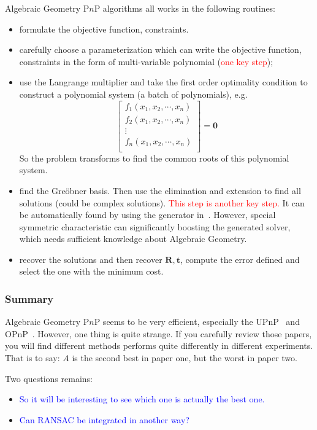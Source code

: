 \documentclass[a4paper]{article}
\begin{document}
Algebraic Geometry P$n$P algorithms all works in the following routines:
\begin{itemize}
\item formulate the objective function, constraints.
\item carefully choose a parameterization which can write the objective function, constraints in the form of multi-variable polynomial (\textcolor{red}{one key step});
\item use the Langrange multiplier and take the first order optimality condition to construct a polynomial system (a batch of polynomials), e.g. 
$$
\left[ 
\begin{matrix}
f_1(x_1,x_2,\cdots,x_n) \\
f_2(x_1,x_2,\cdots,x_n) \\
\vdots \\
f_n(x_1,x_2,\cdots,x_n) \\
\end{matrix}
\right]=\mathbf{0}
$$
So the problem transforms to find the common roots of this polynomial system. 
\item find the Gre\"obner basis. Then use the elimination and extension to find all solutions (could be complex solutions). \textcolor{red}{This step is another key step.} It can be automatically found by using the generator in~\cite{kukelova2008automatic}. However, special symmetric characteristic can significantly boosting the generated solver, which needs sufficient knowledge about Algebraic Geometry.
\item recover the solutions and then recover $\mathbf{R,t}$, compute the error defined and select the one with the minimum cost.
\end{itemize}

\subsubsection{Summary}
Algebraic Geometry P$n$P seems to be very efficient, especially the UPnP~\cite{kneip2014upnp} and OPnP~\cite{zheng2013revisiting}. However, one thing is quite strange. If you carefully review those papers, you will find different methods performs quite differently in different experiments. That is to say: $A$ is the second best in paper one, but the worst in paper two. 

Two questions remains:
\begin{itemize}
\item \textcolor{blue}{So it will be interesting to see which one is actually the best one.} 
\item \textcolor{blue}{Can RANSAC be integrated in another way?}
\end{itemize}
\end{document}
